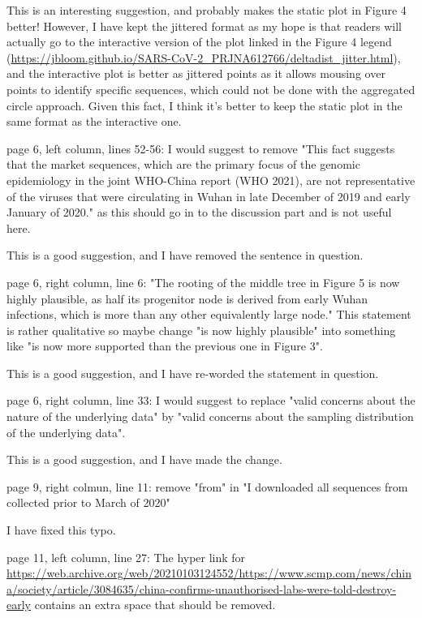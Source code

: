 \documentclass[11pt, oneside]{article}   	%
\newcommand{\response}[1]{{\color{black}#1}}
\begin{document}
\response{This is an interesting suggestion, and probably makes the static plot in Figure 4 better! However, I have kept the jittered format as my hope is that readers will actually go to the interactive version of the plot linked in the Figure 4 legend (\url{https://jbloom.github.io/SARS-CoV-2_PRJNA612766/deltadist_jitter.html}), and the interactive plot is better as jittered points as it allows mousing over points to identify specific sequences, which could not be done with the aggregated circle approach. Given this fact, I think it's better to keep the static plot in the same format as the interactive one.}

page 6, left column, lines 52-56: I would suggest to remove "This fact suggests that the market sequences, which are the primary focus of the genomic epidemiology in the joint WHO-China report (WHO 2021), are not representative of the viruses that were circulating in Wuhan in late December of 2019 and early January of 2020." as this should go in to the discussion part and is not useful here.

\response{This is a good suggestion, and I have removed the sentence in question.}

page 6, right column, line 6: "The rooting of the middle tree in Figure 5 is now highly plausible, as half its progenitor node is derived from early Wuhan infections, which is more than any other equivalently large node." This statement is rather qualitative so maybe change  "is now highly plausible" into something like "is now more supported than the previous one in Figure 3".

\response{This is a good suggestion, and I have re-worded the statement in question.}

page 6, right column, line 33: I would suggest to replace "valid concerns about the nature of the underlying data" by "valid concerns about the sampling distribution of the underlying data".

\response{This is a good suggestion, and I have made the change.}

page 9, right colmun, line 11: remove "from" in "I downloaded all sequences from collected prior to March of 2020"

\response{I have fixed this typo.}

page 11, left column, line 27: The hyper link for \url{https://web.archive.org/web/20210103124552/https://www.scmp.com/news/china/society/article/3084635/china-confirms-unauthorised-labs-were-told-destroy-early}  contains an extra space that should be removed.
\end{document}
